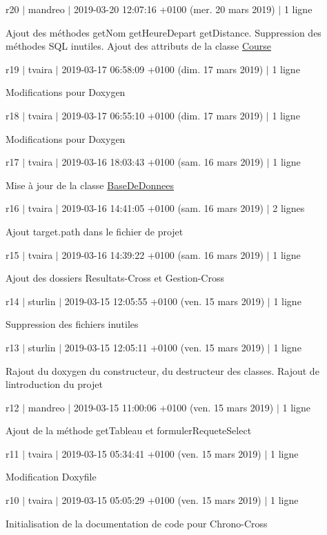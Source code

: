 r20 $\vert$ mandreo $\vert$ 2019-\/03-\/20 12\+:07\+:16 +0100 (mer. 20 mars 2019) $\vert$ 1 ligne

Ajout des méthodes get\+Nom get\+Heure\+Depart get\+Distance. Suppression des méthodes S\+QL inutiles. Ajout des attributs de la classe \hyperlink{class_course}{Course}

r19 $\vert$ tvaira $\vert$ 2019-\/03-\/17 06\+:58\+:09 +0100 (dim. 17 mars 2019) $\vert$ 1 ligne

Modifications pour Doxygen

r18 $\vert$ tvaira $\vert$ 2019-\/03-\/17 06\+:55\+:10 +0100 (dim. 17 mars 2019) $\vert$ 1 ligne

Modifications pour Doxygen

r17 $\vert$ tvaira $\vert$ 2019-\/03-\/16 18\+:03\+:43 +0100 (sam. 16 mars 2019) $\vert$ 1 ligne

Mise à jour de la classe \hyperlink{class_base_de_donnees}{Base\+De\+Donnees}

r16 $\vert$ tvaira $\vert$ 2019-\/03-\/16 14\+:41\+:05 +0100 (sam. 16 mars 2019) $\vert$ 2 lignes

Ajout target.\+path dans le fichier de projet

r15 $\vert$ tvaira $\vert$ 2019-\/03-\/16 14\+:39\+:22 +0100 (sam. 16 mars 2019) $\vert$ 1 ligne

Ajout des dossiers Resultats-\/\+Cross et Gestion-\/\+Cross

r14 $\vert$ sturlin $\vert$ 2019-\/03-\/15 12\+:05\+:55 +0100 (ven. 15 mars 2019) $\vert$ 1 ligne

Suppression des fichiers inutiles

r13 $\vert$ sturlin $\vert$ 2019-\/03-\/15 12\+:05\+:11 +0100 (ven. 15 mars 2019) $\vert$ 1 ligne

Rajout du doxygen du constructeur, du destructeur des classes. Rajout de l\textquotesingle{}introduction du projet

r12 $\vert$ mandreo $\vert$ 2019-\/03-\/15 11\+:00\+:06 +0100 (ven. 15 mars 2019) $\vert$ 1 ligne

Ajout de la méthode get\+Tableau et formuler\+Requete\+Select

r11 $\vert$ tvaira $\vert$ 2019-\/03-\/15 05\+:34\+:41 +0100 (ven. 15 mars 2019) $\vert$ 1 ligne

Modification Doxyfile

r10 $\vert$ tvaira $\vert$ 2019-\/03-\/15 05\+:05\+:29 +0100 (ven. 15 mars 2019) $\vert$ 1 ligne

Initialisation de la documentation de code pour Chrono-\/\+Cross

